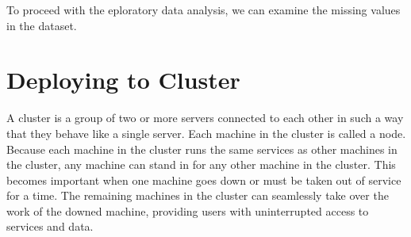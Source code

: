 \documentclass[12pt]{article}
\begin{document}
To proceed with the eploratory data analysis, we can examine the missing values in the dataset. 


\newpage
\section{Deploying to Cluster}
A cluster is a group of two or more servers connected to each other in such a way that they behave like a single server. Each machine in the cluster is called a node. Because each machine in the cluster runs the same services as other machines in the cluster, any machine can stand in for any other machine in the cluster. This becomes important when one machine goes down or must be taken out of service for a time. The remaining machines in the cluster can seamlessly take over the work of the downed machine, providing users with uninterrupted access to services and data.
\end{document}
